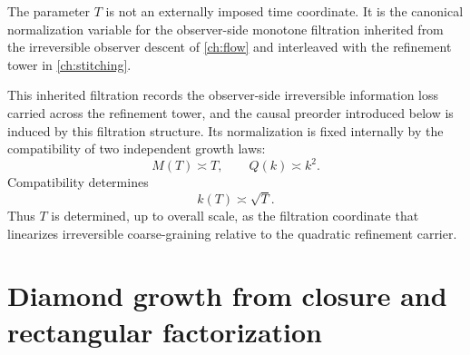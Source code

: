 \begin{remark}
	The parameter \(T\) is not an externally imposed time coordinate.  It
	is the canonical normalization variable for the observer-side
	monotone filtration inherited from the irreversible observer descent
	of \cref{ch:flow} and interleaved with the refinement tower in
	\cref{ch:stitching}.

	This inherited filtration records the observer-side irreversible
	information loss carried across the refinement tower, and the causal
	preorder introduced below is induced by this filtration structure.
	Its normalization is fixed internally by the compatibility of two
	independent growth laws:
	\[
		M(T)\asymp T,
		\qquad
		Q(k)\asymp k^2.
	\]
	Compatibility determines
	\[
		k(T)\asymp \sqrt T.
	\]
	Thus \(T\) is determined, up to overall scale, as the filtration
	coordinate that linearizes irreversible coarse-graining relative to the
	quadratic refinement carrier.
\end{remark}
\section{Diamond growth from closure and rectangular factorization}
\label{sec:diamonds}
